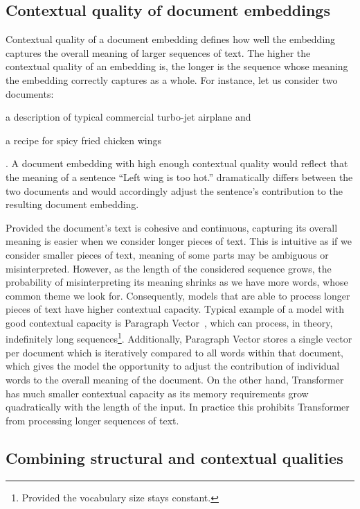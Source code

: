 \subsection{Contextual quality of document embeddings}


Contextual quality of a document embedding defines how well the embedding
captures the overall meaning of larger sequences of text. The higher the
contextual quality of an embedding is, the longer is the sequence whose meaning
the embedding correctly captures as a whole. For instance, let us consider two
documents: \begin{enumerate*}
  \item a description of typical commercial turbo-jet airplane
    and\label{enumitem:plane}
  \item a recipe for spicy fried chicken wings\label{enumitem:chicken}
\end{enumerate*}.
A document embedding with high enough contextual quality would reflect that the
meaning of a sentence ``Left wing is too hot.'' dramatically differs between
the two documents and would accordingly adjust the sentence's contribution to
the resulting document embedding.

Provided the document's text is cohesive and continuous, capturing its overall
meaning is easier when we consider longer pieces of text. This is intuitive as
if we consider smaller pieces of text, meaning of some parts may be ambiguous
or misinterpreted. However, as the length of the considered sequence grows, the
probability of misinterpreting its meaning shrinks as we have more words, whose
common theme we look for. Consequently, models that are able to process longer
pieces of text have higher contextual capacity. Typical example of a model with
good contextual capacity is Paragraph Vector~\citep{le2014distributed}, which
can process, in theory, indefinitely long sequences\footnote{Provided the
vocabulary size stays constant.}. Additionally, Paragraph Vector stores a
single vector per document which is iteratively compared to all words within
that document, which gives the model the opportunity to adjust the contribution
of individual words to the overall meaning of the document. On the other hand,
Transformer~\citep{vaswani2017attention} has much smaller contextual capacity
as its memory requirements grow quadratically with the length of the input. In
practice this prohibits Transformer from processing longer sequences of text.

\subsection{Combining structural and contextual qualities}

